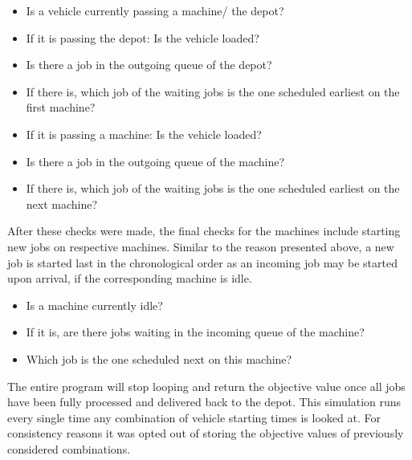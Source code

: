 \begin{itemize}
\item Is a vehicle currently passing a machine/ the depot?

\item If it is passing the depot: Is the vehicle loaded?

\item Is there a job in the outgoing queue of the depot?

\item If there is, which job of the waiting jobs is the one scheduled earliest on the first machine?

\item If it is passing a machine: Is the vehicle loaded?

\item Is there a job in the outgoing queue of the machine?

\item If there is, which job of the waiting jobs is the one scheduled earliest on the next machine?
\end{itemize}

After these checks were made, the final checks for the machines include starting new jobs on respective machines. Similar to the reason presented 
above, a new job is started last in the chronological order as an incoming job may be started upon arrival, if the corresponding machine is idle.

\begin{itemize}
\item Is a machine currently idle?

\item If it is, are there jobs waiting in the incoming queue of the machine?

\item Which job is the one scheduled next on this machine?
\end{itemize}

The entire program will stop looping and return the objective value once all jobs have been fully processed and delivered back to the depot. This
simulation runs every single time any combination of vehicle starting times is looked at. For consistency reasons it was opted out of storing
the objective values of previously considered combinations.